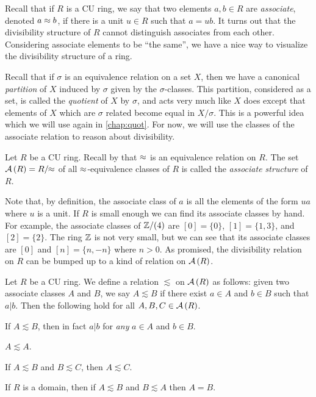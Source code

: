 Recall that if \(R\) is a CU ring, we say that two elements \(a,b \in R\) are \emph{associate}, denoted \(a \approx b\), if there is a unit \(u \in R\) such that \(a = ub\). It turns out that the divisibility structure of \(R\) cannot distinguish associates from each other. Considering associate elements to be ``the same'', we have a nice way to visualize the divisibility structure of a ring.

Recall that if \(\sigma\) is an equivalence relation on a set \(X\), then we have a canonical \emph{partition} of \(X\) induced by \(\sigma\) given by the \(\sigma\)-classes. This partition, considered as a set, is called the \emph{quotient} of \(X\) by \(\sigma\), and acts very much like \(X\) does except that elements of \(X\) which are \(\sigma\) related become equal in \(X/\sigma\). This is a powerful idea which we will use again in \autoref{chap:quot}. For now, we will use the classes of the associate relation to reason about divisibility.

\begin{dfn} \label{dfn:assoc-sld}
Let \(R\) be a CU ring. Recall by  that \(\approx\) is an equivalence relation on \(R\). The set \( \mathcal{A}\left(R\right)  = R/\!\!\approx\) of all \(\approx\)-equivalence classes of \(R\) is called the \emph{associate structure} of \(R\).
\end{dfn}

Note that, by definition, the associate class of \(a\) is all the elements of the form \(ua\) where \(u\) is a unit. If \(R\) is small enough we can find its associate classes by hand. For example, the associate classes of \(\mathbb{Z}/(4)\) are \([0] = \{0\}\), \([1] = \{1,3\}\), and \([2] = \{2\}\). The ring \(\mathbb{Z}\) is not very small, but we can see that its associate classes are \([0]\) and \([n] = \{ n, -n \}\) where \(n > 0\). As promised, the divisibility relation on \(R\) can be bumped up to a kind of relation on \( \mathcal{A}\left(R\right) \).

\begin{prop}
Let \(R\) be a CU ring. We define a relation \(\lesssim\) on \( \mathcal{A}\left(R\right) \) as follows: given two associate classes \(A\) and \(B\), we say \(A \lesssim B\) if there exist \(a \in A\) and \(b \in B\) such that \(a|b\). Then the following hold for all \(A,B,C \in  \mathcal{A}\left(R\right) \).
\begin{proplist*}
\item If \(A \lesssim B\), then in fact \(a|b\) for \emph{any} \(a \in A\) and \(b \in B\).
\item \(A \lesssim A\).
\item If \(A \lesssim B\) and \(B \lesssim C\), then \(A \lesssim C\).
\item If \(R\) is a domain, then if \(A \lesssim B\) and \(B \lesssim A\) then \(A = B\).
\end{proplist*}
\end{prop}

